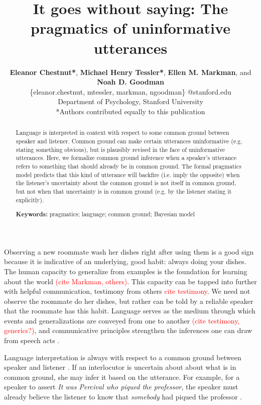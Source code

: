 \documentclass[10pt,letterpaper]{article}
\title{It goes without saying: The pragmatics of uninformative utterances}
\author{{\large \bf Eleanor Chestnut*}, {\large \bf Michael Henry Tessler*},
{\large \bf Ellen M. Markman}, and {\large \bf Noah D. Goodman}  \\
\{eleanor.chestnut, mtessler, markman, ngoodman\} @stanford.edu \\ 
  Department of Psychology, Stanford University \\
  *Authors contributed equally to this publication}
\newcommand{\red}[1]{\textcolor{Red}{#1}}
\begin{document}
\maketitle


\begin{abstract}

Language is interpreted in context with respect to some common ground between speaker and listener.
Common ground can make certain utterances uninformative (e.g. stating something obvious), but is plausibly revised in the face of uninformative utterances.
Here, we formalize common ground inference when a speaker's utterance refers to something that should already be in common ground.
The formal pragmatics model predicts that this kind of utterance will backfire (i.e. imply the opposite) when the listener's uncertainty about the common ground is not itself in common ground, but not when that uncertainty is in common ground (e.g. by the listener stating it explicitly). 


\textbf{Keywords:} 
pragmatics; language; common ground; Bayesian model

\end{abstract}


Observing a new roommate wash her dishes right after using them is a good sign because it is indicative of an underlying, good habit: always doing your dishes.
The human capacity to generalize from examples is the foundation for learning about the world \red{(cite Markman, others)}.
This capacity can be tapped into further with helpful communication, testimony from others \red{cite testimony}. 
We need not observe the roommate do her dishes, but rather can be told by a reliable speaker that the roommate has this habit.
Language serves as the medium through which events and generalizations are conveyed from one to another \red{(cite testimony, generics?)}, and communicative principles strengthen the inferences one can draw from speech acts \cite{Grice1975}. 

Language interpretation is always with respect to a common ground between speaker and listener \cite{Clark1996}.
If an interlocutor is uncertain about about what is in common ground, she may infer it based on the utterance. 
For example, for a speaker to assert \emph{It was Percival who piqued the professor}, the speaker must already believe the listener to know that \emph{somebody} had piqued the professor \cite{Clark1977}.


\end{document}

